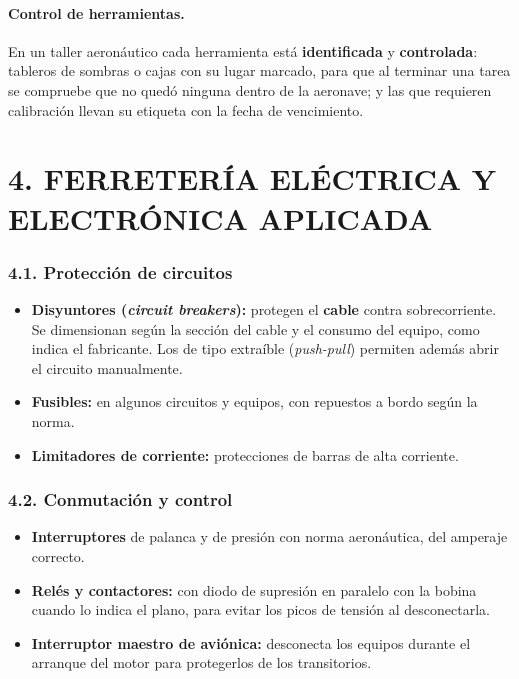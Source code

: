 \paragraph*{Control de herramientas.} En un taller aeronáutico cada herramienta está
\textbf{identificada} y \textbf{controlada}: tableros de sombras o cajas con su lugar marcado, para
que al terminar una tarea se compruebe que no quedó ninguna dentro de la aeronave; y las que
requieren calibración llevan su etiqueta con la fecha de vencimiento.

\section*{4. FERRETERÍA ELÉCTRICA Y ELECTRÓNICA APLICADA}

\subsubsection*{4.1. Protección de circuitos}
\begin{itemize}
  \item \textbf{Disyuntores (\textit{circuit breakers}):} protegen el \textbf{cable} contra
        sobrecorriente. Se dimensionan según la sección del cable y el consumo del equipo, como
        indica el fabricante. Los de tipo extraíble (\textit{push-pull}) permiten además abrir el
        circuito manualmente.
  \item \textbf{Fusibles:} en algunos circuitos y equipos, con repuestos a bordo según la norma.
  \item \textbf{Limitadores de corriente:} protecciones de barras de alta corriente.
\end{itemize}

\subsubsection*{4.2. Conmutación y control}
\begin{itemize}
  \item \textbf{Interruptores} de palanca y de presión con norma aeronáutica, del amperaje correcto.
  \item \textbf{Relés y contactores:} con diodo de supresión en paralelo con la bobina cuando lo
        indica el plano, para evitar los picos de tensión al desconectarla.
  \item \textbf{Interruptor maestro de aviónica:} desconecta los equipos durante el arranque del
        motor para protegerlos de los transitorios.
\end{itemize}

